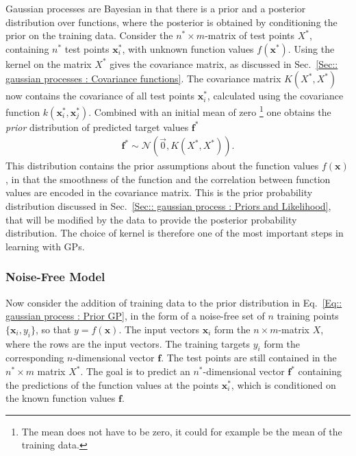 \documentclass[twoside,english]{uiofysmaster}
\begin{document}
{Gaussian processes are Bayesian in that there is a prior and a posterior distribution over functions, where the posterior is obtained by conditioning the prior on the training data. Consider the $n^* \times m$-matrix of test points $X^*$, containing $n^*$ test points $\textbf{x}_i^*$, with unknown function values $f(\textbf{x}^*)$. Using the kernel on the matrix $X^*$ gives the covariance matrix, as discussed in Sec.~\ref{Sec:: gaussian processes : Covariance functions}. The covariance matrix $K(X^*, X^*)$ now contains the covariance of all test points $\textbf{x}^*_i$, calculated using the covariance function $k(\textbf{x}_i^*, \textbf{x}_j^*)$. Combined with an initial mean of zero \footnote{The mean does not have to be zero, it could for example be the mean of the training data.} one obtains the \textit{prior} distribution of predicted target values $\textbf{f}^*$
\begin{align}
\textbf{f}^* \sim \mathcal{N} (\vec{0}, K(X^*, X^*)).\label{Eq:: gaussian process : Prior GP}
\end{align} 
This distribution contains the prior assumptions about the function values $f(\textbf{x})$, in that the smoothness of the function and the correlation between function values are encoded in the covariance matrix. This is the prior probability distribution discussed in Sec.~\ref{Sec:: gaussian process : Priors and Likelihood}, that will be modified by the data to provide the posterior probability distribution. The choice of kernel is therefore one of the most important steps in learning with GPs. 

\subsubsection{Noise-Free Model}

Now consider the addition of training data to the prior distribution in Eq.~\ref{Eq:: gaussian process : Prior GP}, in the form of a noise-free set of $n$ training points $\{\textbf{x}_i, y_i\}$, so that $y = f(\textbf{x})$. The input vectors $\textbf{x}_i$ form the $n \times m$-matrix $X$, where the rows are the input vectors. The training targets $y_i$ form the corresponding $n$-dimensional vector $\textbf{f}$. The test points are still contained in the $n^* \times m$ matrix $X^*$. The goal is to predict an $n^*$-dimensional vector $\textbf{f}^*$ containing the predictions of the function values at the points $\textbf{x}^*_i$, which is conditioned on the known function values $\textbf{f}$. 

}
\end{document}
